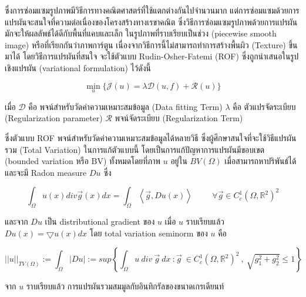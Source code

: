 \documentclass[hidelinks,a4paper,14pt]{article}
\numberwithin{equation}{section}							%
\begin{document}
{		%
		ซึ่งการซ่อมแซมรูปภาพมีวิธีการทางคณิตศาสตร์ที่ใช้แตกต่างกันไปจำนวนมาก แต่การซ่อมแซมด้วยการแปรผันจะสนใจที่ความต่อเนื่องของโครงสร้างทางเรขาคณิต ซึ่งวิธีการซ่อมแซมรูปภาพด้วยการแปรผันมักจะให้ผลลัพธ์ได้ดีกับพื้นที่แคบและเล็ก ในรูปภาพที่ราบเรียบเป็นช่วง (piecewise smooth image) หรือที่เรียกกันว่าภาพการ์ตูน เนื่องจากวิธีการนี้ไม่สามารถทำการสร้างพื้นผิว (Texture) ขึ้นมาได้ \cite{ref:defination-of-variation-inpaint} โดยวิธีการแปรผันที่สนใจ จะใช้ตัวแบบ   Rudin-Osher-Fatemi (ROF) \cite{ref:ROF-template}ซึ่งถูกนำเสนอในรูปเชิงแปรผัน  (variational formulation) ไว้ดังนี้ 
		
		$$\min_{u} \{ \mathcal{J}(u)= \lambda \mathcal{D}(u,f)+  \mathcal{R}(u) \}$$

		เมื่อ $\mathcal{D}$ คือ พจน์สำหรับวัดค่าความเหมาะสมข้อมูล (Data fitting Term) $\lambda$ คือ ตัวแปรจัดระเบียบ (Regularization parameter)  $\mathcal{R}$ พจน์จัดระเบียบ (Regularization Term) 
		
		ซึ่งตัวแบบ ROF พจน์สำหรับวัดค่าความเหมาะสมข้อมูลได้หลายวิธี ซึ่งผู้ศึกษาสนใจที่จะใช้วิธีแปรผันรวม (Total Variation) \cite{ref:splitbergman-denoise} ในการแก้ตัวแบบนี้	 โดยเป็นการแก้ปัญหาการแปรผันมีขอบเขต (bounded variation หรือ BV) ทั้งหมดโดยที่ภาพ $u$ อยู่ใน $BV(\Omega)$ เมื่อสามารถหาปริพันธ์ได้และจะมี Radon measure $Du$ ซึ่ง 
		
		$$\int_{\Omega}u(x) div \vec{g}(x) dx = \int_{\Omega} \left\langle\vec{g},Du(x) \right\rangle\hspace{1cm}\forall\vec{g} \in C_c^1(\Omega,\mathbb{R}^2)^2$$
		
		และจาก $Du$ เป็น distributional gradient ของ $u$ เมื่อ $u$ ราบเรียบแล้ว  $Du(x)= \bigtriangledown u(x)dx $
		โดย total variation seminorm ของ $u$ คือ 
		
		$$ ||u||_{TV(\Omega)} := \int_{\Omega} | Du | := sup{ \left \{ \int_{\Omega}  u \ div  \ \vec{g} \ dx \  : \vec{g} \  \in C_c^1(\Omega,\mathbb{R}^2)^2 \ , \ \sqrt{g_1^2+g_2^2} \leq 1 \right \} }  $$
		
		จาก $u$ ราบเรียบแล้ว การแปรผันรวมสมมูลกับอินทิกรัลของขนาดเกรเดียนท์ 
		
}
\end{document}
